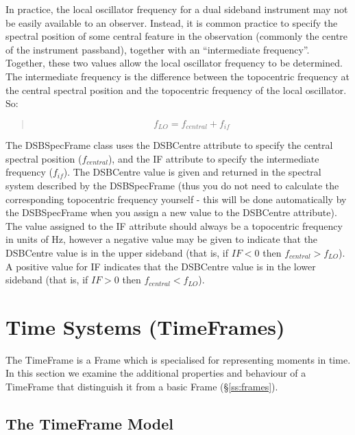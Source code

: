 \documentclass[twoside,11pt]{article}
\newcommand{\xlabel}[1]{}
\newcommand{\secref}[1]{\S\ref{#1}}
\newcommand{\secref}[1]{\ref{#1}}
\begin{document}
In practice, the local oscillator frequency for a dual sideband
instrument may not be easily available to an observer. Instead, it is
common practice to specify the spectral position of some central feature
in the observation (commonly the centre of the instrument passband),
together with an ``intermediate frequency''. Together, these two values
allow the local oscillator frequency to be determined. The intermediate
frequency is the difference between the topocentric frequency at the
central spectral position and the topocentric frequency of the local
oscillator. So:

\begin{quote}
\begin{small}
\begin{equation}
\label{eqn:dsb}
   f_{LO} = f_{central} + f_{if}
\end{equation}
\end{small}
\end{quote}

The DSBSpecFrame class uses the DSBCentre attribute to specify the central 
spectral position ($f_{central}$), and the IF attribute to specify the 
intermediate frequency ($f_{if}$). The DSBCentre value is given and returned 
in the spectral system described by the DSBSpecFrame (thus you do not need to
calculate the corresponding topocentric frequency yourself - this will be
done automatically by the DSBSpecFrame when you assign a new value to the
DSBCentre attribute). The value assigned to the IF attribute should
always be a topocentric frequency in units of Hz, however a negative
value may be given to indicate that the DSBCentre value is in the upper
sideband (that is, if $IF < 0$  then $f_{central} > f_{LO}$). A positive
value for IF indicates that the DSBCentre value is in the lower sideband
(that is, if $IF > 0$  then $f_{central} < f_{LO}$).


\cleardoublepage
\section{\xlabel{ss_timeframes}\label{ss:timeframes}Time Systems (TimeFrames)}

The TimeFrame is a Frame which is specialised for representing moments in
time. In this section we examine the additional properties and behaviour of a 
TimeFrame that distinguish it from a basic Frame (\secref{ss:frames}).

\subsection{The TimeFrame Model}
\end{document}
